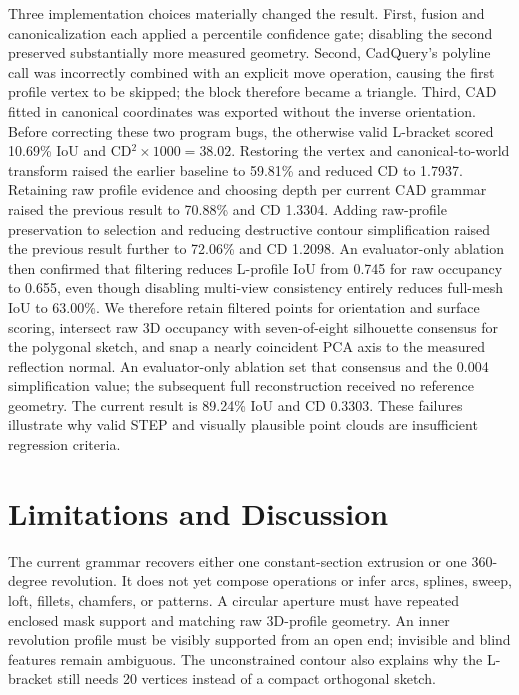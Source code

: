 \documentclass[10pt]{article}
\begin{document}
Three implementation choices materially changed the result.  First, fusion and
canonicalization each applied a percentile confidence gate; disabling the
second preserved substantially more measured geometry.  Second, CadQuery's
polyline call was incorrectly combined with an explicit move operation, causing
the first profile vertex to be skipped; the block therefore became a triangle.
Third, CAD fitted in canonical coordinates was exported without the inverse
orientation.  Before correcting these two program bugs, the otherwise valid
L-bracket scored 10.69\% IoU and CD$^2\times1000=38.02$.  Restoring the vertex and
canonical-to-world transform raised the earlier baseline to 59.81\% and reduced
CD to 1.7937.  Retaining raw profile evidence and choosing depth per current CAD
grammar raised the previous result to 70.88\% and CD 1.3304.  Adding raw-profile
preservation to selection and reducing destructive contour simplification
raised the previous result further to 72.06\% and CD 1.2098.  An
evaluator-only ablation then confirmed that filtering reduces L-profile IoU
from 0.745 for raw occupancy to 0.655, even though disabling multi-view
consistency entirely reduces full-mesh IoU to 63.00\%.  We therefore retain
filtered points for orientation and surface scoring, intersect raw 3D
occupancy with seven-of-eight silhouette consensus for the polygonal sketch,
and snap a nearly coincident PCA axis to the measured reflection normal. An
evaluator-only ablation set that consensus and the 0.004 simplification value;
the subsequent full reconstruction received no reference geometry.  The
current result is 89.24\% IoU and CD 0.3303.
These failures illustrate why valid STEP and visually plausible point clouds
are insufficient regression criteria.

\section{Limitations and Discussion}

The current grammar recovers either one constant-section extrusion or one
360-degree revolution.  It does not yet compose operations or infer arcs,
splines, sweep, loft, fillets, chamfers, or patterns.  A circular aperture must
have repeated enclosed mask support and matching raw 3D-profile geometry.  An
inner revolution profile must be visibly supported from an open end; invisible
and blind features remain ambiguous.  The unconstrained contour also explains
why the L-bracket still needs 20 vertices instead of a compact orthogonal sketch.
\end{document}
